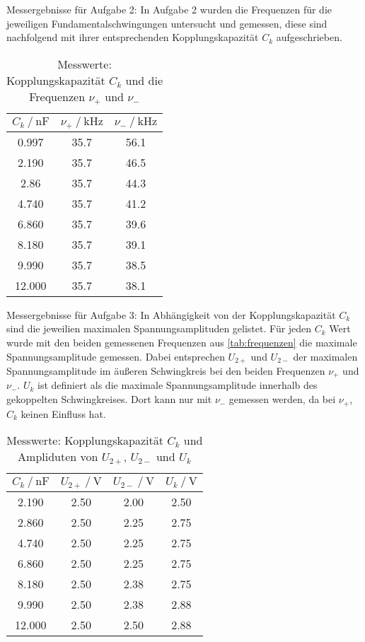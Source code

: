 Messergebnisse für Aufgabe 2:
In Aufgabe 2 wurden die Frequenzen für die jeweiligen Fundamentalschwingungen untersucht und gemessen, diese sind nachfolgend mit ihrer entsprechenden Kopplungskapazität $C_k$ aufgeschrieben.

\begin{table}
  \centering
  \caption{Messwerte: Kopplungskapazität $C_k $ und die Frequenzen $\nu _+$ und $\nu _-$}
  \label{tab:frequenzen}
  \begin{tabular}{c c c}
    \toprule 
    $C_k \:/\: \si{\nano\farad}$ & $\nu _+ \:/\: \si{\kilo\hertz}$ & $\nu _- \:/\: \si{\kilo\hertz}$   \\ 
    \midrule 
    0.997 & 35.7 & 56.1 \\
    2.190 & 35.7 & 46.5 \\
    2.86 & 35.7 & 44.3 \\
    4.740 & 35.7 & 41.2 \\
    6.860 & 35.7 & 39.6 \\
    8.180 & 35.7 & 39.1 \\
    9.990 & 35.7 & 38.5 \\
    12.000 & 35.7 & 38.1 \\
    \bottomrule
  \end{tabular}
\end{table}

Messergebnisse für Aufgabe 3:
In Abhängigkeit von der Kopplungskapazität $C_k$ sind die jeweilien maximalen Spannungsamplituden gelistet. Für jeden $C_k$ Wert wurde mit den beiden gemessenen Frequenzen aus \autoref{tab:frequenzen} die maximale Spannungsamplitude gemessen. Dabei entsprechen $U_{2+}$ und $U_{2-}$ der maximalen Spannungsamplitude im äußeren Schwingkreis bei den beiden Frequenzen $\nu _+$ und $\nu _-$. $U_k$ ist definiert als die maximale Spannungsamplitude innerhalb des gekoppelten Schwingkreises. Dort kann nur mit $\nu _-$ gemessen werden, da bei $\nu _+$, $C_k$ keinen Einfluss hat.

\begin{table}
  \centering
  \caption{Messwerte: Kopplungskapazität $C_k $ und Ampliduten von $U_{2+}$, $U_{2-}$ und $U_k$}
  \label{tab:amplituden}
  \begin{tabular}{c c c c}
    \toprule 
    $C_k \:/\: \si{\nano\farad}$ & $U_{2+} \:/\: \si{\volt}$ & $U_{2-} \:/\: \si{\volt}$ &  $U_k \:/\: \si{\volt}$       \\ 
    \midrule 
    2.190 & 2.50 & 2.00 & 2.50 \\
    2.860 & 2.50 & 2.25 & 2.75 \\
    4.740 & 2.50 & 2.25 & 2.75 \\
    6.860 & 2.50 & 2.25 & 2.75 \\
    8.180 & 2.50 & 2.38 & 2.75 \\
    9.990 & 2.50 & 2.38 & 2.88 \\
    12.000 & 2.50 & 2.50 & 2.88 \\
    \bottomrule
  \end{tabular}
\end{table}


